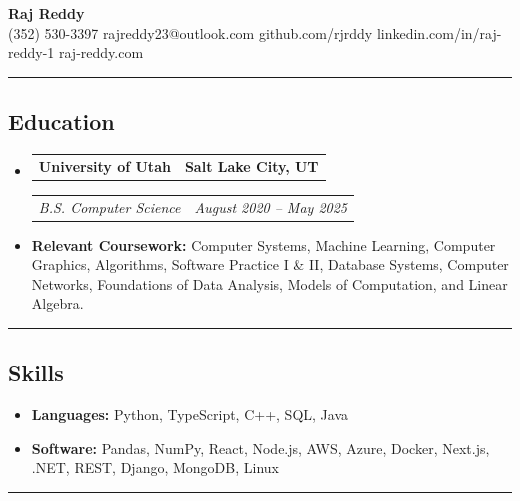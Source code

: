 \documentclass[11pt,letterpaper]{article}
\makeatletter
\newcommand{\headerrow}[2]
{\begin{tabular*}{\linewidth}{l@{\extracolsep{\fill}}r}
#1 &
#2 \\
\end{tabular*}}
\makeatother
\begin{document}
\begin{center}
	{\LARGE \textbf{Raj Reddy}}\\
	\vspace{0.05cm}
	(352) 530-3397
    \hfill rajreddy23@outlook.com
    \hfill github.com/rjrddy
    \hfill linkedin.com/in/raj-reddy-1
    \hfill raj-reddy.com
\end{center}
\hrule
{}

\vspace{-1em}
\subsection*{\Large Education}
\renewcommand\labelitemi{}
\begin{itemize}[leftmargin=1em]
	\parskip=0.1em
	\item
	      \headerrow
	      {\textbf{University of Utah}}
	      {\textbf{Salt Lake City, UT}}
	      \headerrow
	      {\emph{B.S. Computer Science}}
	      {\emph{August 2020 -- May 2025}}
	      \item \textbf{Relevant Coursework:} Computer Systems, Machine Learning, Computer Graphics, Algorithms, Software Practice I \& II, Database Systems, Computer Networks, Foundations of Data Analysis, Models of Computation, and Linear Algebra.
\end{itemize}
\hrule
{}

\vspace{-1em}
\subsection*{\Large Skills}
\begin{itemize}[leftmargin=1em]
    \parskip=0.1em
	\item \textbf{Languages:} Python, TypeScript, C++, SQL, Java
	\item \textbf{Software:} Pandas, NumPy, React, Node.js, AWS, Azure, Docker, Next.js, .NET, REST, Django, MongoDB, Linux
\end{itemize}
\hrule
{}

\vspace{-1em}
\end{document}

